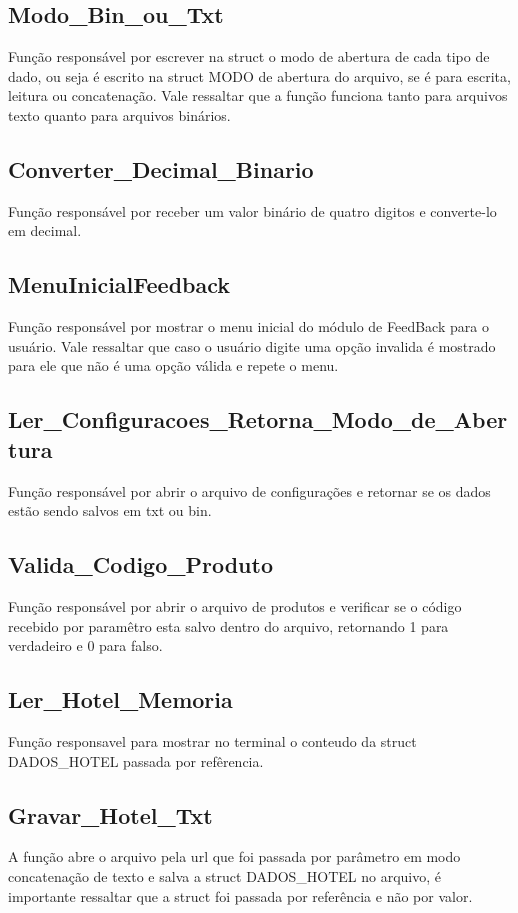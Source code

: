 \documentclass{article}
\begin{document}
\subsection{Modo\_Bin\_ou\_Txt}
	Função responsável por escrever na struct o modo de abertura de cada tipo de dado, ou seja é escrito na struct MODO de abertura do arquivo, se é para escrita, leitura ou concatenação. Vale ressaltar que a função funciona tanto para arquivos texto quanto para arquivos binários.
\subsection{Converter\_Decimal\_Binario}
	Função responsável por receber um valor binário de quatro digitos e converte-lo em decimal.
\subsection{MenuInicialFeedback}
	Função responsável por mostrar o menu inicial do módulo de FeedBack para o usuário. Vale ressaltar que caso o usuário digite uma opção invalida é mostrado para ele que não é uma opção válida e repete o menu.
\subsection{Ler\_Configuracoes\_Retorna\_Modo\_de\_Abertura}
	Função responsável por abrir o arquivo de configurações e retornar se os dados estão sendo salvos em txt ou bin.
\subsection{Valida\_Codigo\_Produto}
	Função responsável por abrir o arquivo de produtos e verificar se o código recebido por paramêtro esta salvo dentro do arquivo, retornando 1 para verdadeiro e 0 para falso.
\subsection{Ler\_Hotel\_Memoria}
	Função responsavel para mostrar no terminal o conteudo da struct DADOS\_HOTEL passada por  refêrencia.

\subsection{Gravar\_Hotel\_Txt}
	A função abre o arquivo pela url que foi passada por parâmetro em modo concatenação de texto e salva a struct DADOS\_HOTEL  no arquivo, é importante ressaltar que  a struct foi passada por referência e não por valor.
\end{document}
